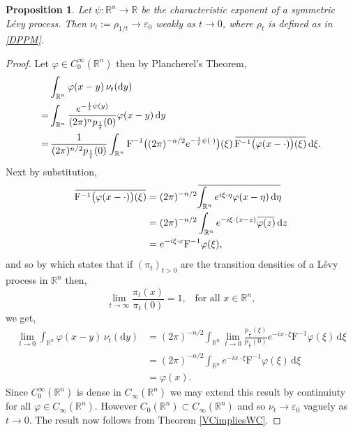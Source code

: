 \documentclass[a4paper, 12pt]{report}
\newtheorem{proposition}[theorem]{Proposition}
\theoremstyle{remark}
\theoremstyle{definition}
\newcommand{\overbar}[1]{\mkern 1.5mu\overline{\mkern-1.5mu#1\mkern-1.5mu}\mkern 1.5mu}
\begin{document}
\begin{proposition}\label{SharedPropWithNiels}
Let $\psi : \mathbb{R}^n \to \mathbb{R}$ be the characteristic exponent of a symmetric L\'evy process.  Then $\nu_t := \rho_{1/t} \to \varepsilon_0$ weakly as $t \to 0$, where $\rho_t$ is defined as in \eqref{DPPM}.
\end{proposition}
\begin{proof}
Let $\varphi \in C_0^\infty(\mathbb{R}^n)$ then by Plancherel's Theorem,
$$
\begin{aligned}
& \int_{\mathbb{R}^n}\varphi(x - y)\,\nu_t(\mathrm{d}y)\\
= & \int_{\mathbb{R}^n}\frac{e^{-\frac{1}{t}\psi(y)}}{(2\pi)^np_\frac{1}{t}(0)}\varphi(x - y)\,\mathrm{d}y\\
= & \, \frac{1}{(2\pi)^{n/2}p_\frac{1}{t}(0)}\int_{\mathbb{R}^n}\mathrm{F}^{-1}\big((2\pi)^{-n/2}e^{-\frac{1}{t}\psi(\cdot)}\big)(\xi)\,\overbar{\mathrm{F}^{-1}\big(\varphi(x - \cdot)\big)(\xi)}\,\mathrm{d}\xi.
\end{aligned}
$$
Next by substitution,
$$
\begin{aligned}
\overbar{\mathrm{F}^{-1}\big(\varphi(x - \cdot)\big)(\xi)} & = (2\pi)^{-n/2}\overbar{\int_{\mathbb{R}^n}e^{i\xi\cdot\eta}\varphi(x - \eta)\,\mathrm{d}\eta}\\
& = (2\pi)^{-n/2}\int_{\mathbb{R}^n}e^{-i\xi\cdot(x - z)}\overbar{\varphi(z)}\,\mathrm{d}z\\
& = e^{-i\xi\cdot x}\mathrm{F}^{-1}\varphi(\xi),
\end{aligned}
$$
and so by \cite[Theorem 14]{DProofPaper} which states that if $(\pi_t)_{t > 0}$ are the transition densities of a L\'evy process in $\mathbb{R}^n$ then,
$$
\lim_{t \to \infty}\frac{\pi_t(x)}{\pi_t(0)} = 1, \,\,\,\,\, \text{for all} \,\, x \in \mathbb{R}^n,
$$
we get,
$$
\begin{aligned}
\lim_{t \to 0}\int_{\mathbb{R}^n}\varphi(x - y)\,\nu_t(\mathrm{d}y) & = (2\pi)^{-n/2}\int_{\mathbb{R}^n}\lim_{t \to 0}\frac{p_\frac{1}{t}(\xi)}{p_\frac{1}{t}(0)}e^{-ix\cdot\xi}\mathrm{F}^{-1}\varphi(\xi)\,\mathrm{d}\xi\\
& = (2\pi)^{-n/2}\int_{\mathbb{R}^n}e^{-ix\cdot\xi}\mathrm{F}^{-1}\varphi(\xi)\,\mathrm{d}\xi\\
& = \varphi(x).
\end{aligned}
$$
Since $C_0^\infty(\mathbb{R}^n)$ is dense in $C_\infty(\mathbb{R}^n)$ we may extend this result by continuiuty for all $\varphi \in C_\infty(\mathbb{R}^n)$.  However $C_0(\mathbb{R}^n) \subset C_\infty(\mathbb{R}^n)$ and so $\nu_t \to \varepsilon_0$ vaguely as $t \to 0$.  The result now follows from Theorem \ref{VCimpliesWC}.
\end{proof}
\end{document}
